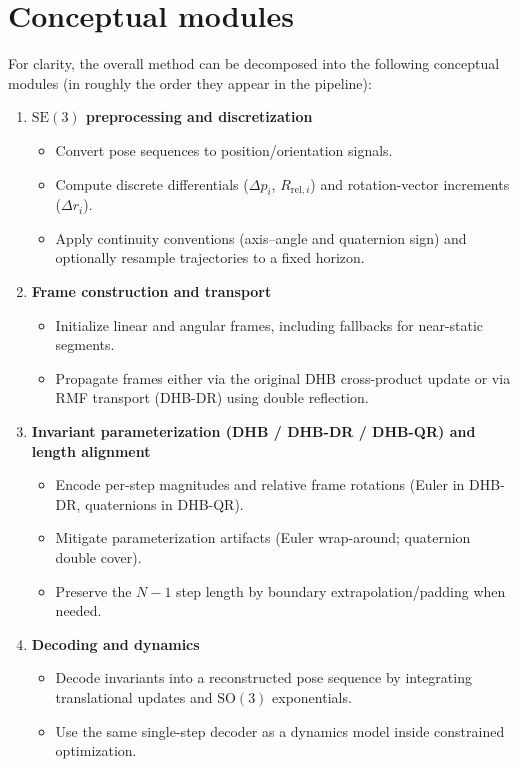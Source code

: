 \documentclass[11pt]{article}
\begin{document}
\section{Conceptual modules}
For clarity, the overall method can be decomposed into the following conceptual modules (in roughly the order they appear in the pipeline):
\begin{enumerate}
  \item \textbf{$\mathrm{SE}(3)$ preprocessing and discretization}
    \begin{itemize}
      \item Convert pose sequences to position/orientation signals.
      \item Compute discrete differentials ($\Delta p_i$, $R_{\mathrm{rel},i}$) and rotation-vector increments ($\Delta r_i$).
      \item Apply continuity conventions (axis--angle and quaternion sign) and optionally resample trajectories to a fixed horizon.
    \end{itemize}

  \item \textbf{Frame construction and transport}
    \begin{itemize}
      \item Initialize linear and angular frames, including fallbacks for near-static segments.
      \item Propagate frames either via the original DHB cross-product update or via RMF transport (DHB-DR) using double reflection.
    \end{itemize}

  \item \textbf{Invariant parameterization (DHB / DHB-DR / DHB-QR) and length alignment}
    \begin{itemize}
      \item Encode per-step magnitudes and relative frame rotations (Euler in DHB-DR, quaternions in DHB-QR).
      \item Mitigate parameterization artifacts (Euler wrap-around; quaternion double cover).
      \item Preserve the $N-1$ step length by boundary extrapolation/padding when needed.
    \end{itemize}

  \item \textbf{Decoding and dynamics}
    \begin{itemize}
      \item Decode invariants into a reconstructed pose sequence by integrating translational updates and $\mathrm{SO}(3)$ exponentials.
      \item Use the same single-step decoder as a dynamics model inside constrained optimization.
    \end{itemize}


\end{enumerate}
\end{document}
